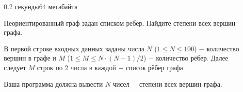 \begin{problem}{}{}{}{0.2 секунды}{64 мегабайта}

Неориентированный граф задан списком ребер. Найдите степени всех вершин графа.

\InputFile
В первой строке входных данных заданы числа $N$ ($1 \le N \le 100$) $-$ количество вершин в графе 
и $M$ ($1 \le M \le N\cdot (N-1) / 2$) $-$ количество рёбер.
Далее следует $M$ строк по $2$ числа в каждой $-$ список рёбер графа. 

\OutputFile
Ваша программа должна вывести $N$ чисел $-$ степени всех вершин графа.

\Example

\begin{example}
%
\end{example}

\end{problem}

